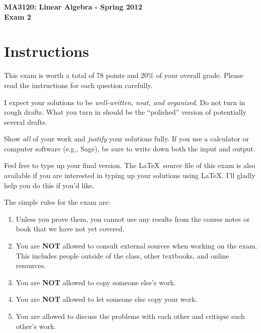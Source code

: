 \documentclass[11pt]{article}
\theoremstyle{definition}
\begin{document}
\begin{center}

{\Large\bf MA3120: Linear Algebra - Spring 2012}\\
\smallskip
{\Large\bf Exam 2}

\bigskip

  
  \bigskip
  

\end{center}

\section*{Instructions}

This exam is worth a total of 78 points and 20\% of your overall grade.  Please read the instructions for each question carefully.

\bigskip

I expect your solutions to be \emph{well-written, neat, and organized}.  Do not turn in rough drafts.  What you turn in should be the ``polished'' version of potentially several drafts.  

\bigskip

Show \emph{all} of your work and \emph{justify} your solutions fully.  If you use a calculator or computer software (e.g., Sage), be sure to write down both the input and output.

\bigskip

Feel free to type up your final version.  The \LaTeX\ source file of this exam is also available if you are interested in typing up your solutions using \LaTeX.  I'll gladly help you do this if you'd like.

\bigskip

The simple rules for the exam are:

\begin{enumerate}
\item Unless you prove them, you cannot use any results from the course notes or book that we have not yet covered.
\item You are \textbf{NOT} allowed to consult external sources when working on the exam.  This includes people outside of the class, other textbooks, and online resources.
\item You are \textbf{NOT} allowed to copy someone else's work.
\item You are \textbf{NOT} allowed to let someone else copy your work.
\item You are allowed to discuss the problems with each other and critique each other's work.
\end{enumerate}
\end{document}
